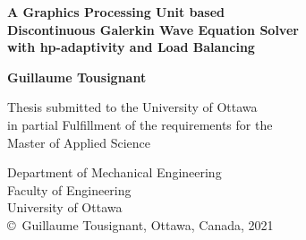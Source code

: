 \thispagestyle{empty}

\begin{titlepage}
	\begin{center}
		\vspace*{1cm} %
		
		{ \LARGE
			\textbf{A Graphics Processing Unit based \\ 
				Discontinuous Galerkin Wave Equation Solver \\
				with hp-adaptivity and Load Balancing \\
			}
		}
		\vspace{1cm}

		
		{\large
			\textbf{Guillaume Tousignant}
		}
	
		\vspace{1cm}
	
		{\large
		Thesis submitted to the University of Ottawa \\
		in partial Fulfillment of the requirements for the \\
		}	
		\vspace{.3cm}
		{\Large
			Master of Applied Science \\
		}
		

		

		
		
		\vspace{3cm}
		Department of Mechanical Engineering \\
		Faculty of Engineering \\
		University of Ottawa \\
		\vfill
		\copyright\ Guillaume Tousignant, Ottawa, Canada, 2021
		
		
	\end{center}
\end{titlepage}
